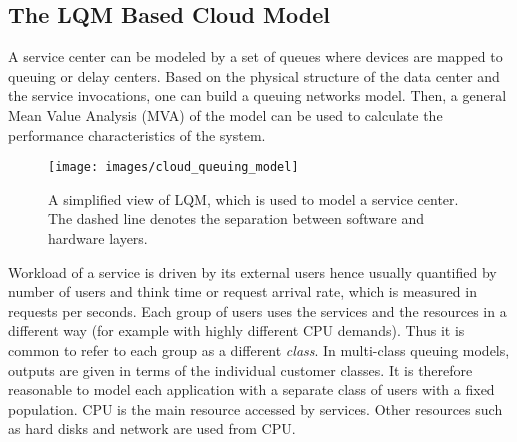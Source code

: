\documentclass[11pt]{article}
\begin{document}
   \subsection{The LQM Based Cloud Model} 
	\label{sec:layered_queuing_model}
	 A service center can be modeled by a set of queues where devices are mapped to queuing or delay centers.  Based on the physical structure of the data center and the service invocations, one can build a queuing networks model. Then, a general Mean Value Analysis (MVA) of the model can be used to calculate the performance characteristics of the system. 
\begin{figure}[htbp]
\begin{center}
	\texttt{[image: images/cloud\_queuing\_model]}
	\caption{A simplified view of LQM, which is used to model a service center. The dashed line denotes the separation between software and hardware layers.}
	\label{fig:cloudQueuingModel}
	\end{center}
\end{figure}


	  Workload of a service is driven by its external users hence usually quantified by number of users and think time or request arrival rate, which is measured in requests per seconds. Each group of users uses the services and the resources in a different way (for example with highly different CPU demands). Thus it is common to refer to each group as a different \textit{class}. In multi-class queuing models, outputs are given in terms of the individual customer classes. It is therefore reasonable to model each application with a separate class of users with a fixed population. 
	 CPU is the main resource accessed by services. Other resources such as hard disks and network are used from CPU. 
\end{document}
